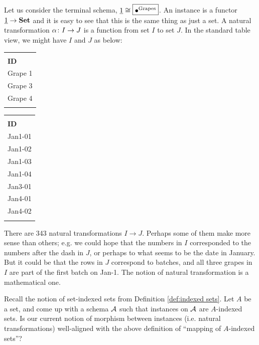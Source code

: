 \documentclass[CT4S-EN-RU]{subfiles}
\begin{document}
\begin{blockRUS}
\end{blockRUS}

\begin{exampleENG}\label{ex:nts on term}
Let us consider the terminal schema, $\underline{1}\cong\fbox{$\bullet^{\textnormal{Grapes}}$}$. An instance is a functor $\underline{1}\rightarrow{\bf Set}$ and it is easy to see that this is the same thing as just a set. A natural transformation $\alpha\colon I\rightarrow J$ is a function from set $I$ to set $J$. In the standard table view, we might have $I$ and $J$ as below:
\begin{center}
\begin{tabular}{| l ||}\bhline
\multicolumn{1}{| c |}{Grapes $(I)$}\\\bhline
{\bf ID}\\\bbhline
Grape 1\\\hline
Grape 3\\\hline
Grape 4\\\bhline
\end{tabular}
\hspace{1in}
\begin{tabular}{| l ||}\bhline
\multicolumn{1}{| c |}{Grapes $(J)$}\\\bhline
{\bf ID}\\\bbhline
Jan1-01\\\hline
Jan1-02\\\hline
Jan1-03\\\hline
Jan1-04\\\hline
Jan3-01\\\hline
Jan4-01\\\hline
Jan4-02\\\bhline
\end{tabular}
\end{center}

There are 343 natural transformations $I\to J$. Perhaps some of them make more sense than others; e.g. we could hope that the numbers in $I$ corresponded to the numbers after the dash in $J$, or perhaps to what seems to be the date in January. But it could be that the rows in $J$ correspond to batches, and all three grapes in $I$ are part of the first batch on Jan-1. The notion of natural transformation is a mathematical one.
\end{exampleENG}

\begin{exampleRUS}\label{ex:nts on term}
\end{exampleRUS}

\begin{exerciseENG}\label{exc:indexed sets as functors}
Recall the notion of set-indexed sets from Definition \ref{def:indexed sets}. Let $A$ be a set, and come up with a schema $\mathcal{A}$ such that instances on $\mathcal{A}$ are $A$-indexed sets. Is our current notion of morphism between instances (i.e. natural transformations) well-aligned with the above definition of “mapping of $A$-indexed sets”?
\end{exerciseENG}
\end{document}

